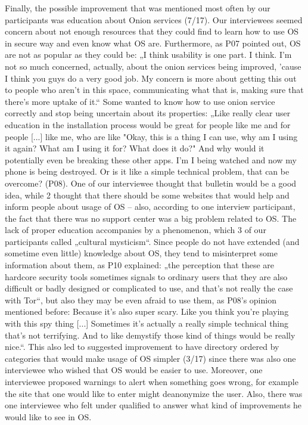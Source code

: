 Finally, the possible improvement that was mentioned most often by our participants was education about Onion services (7/17). Our interviewees seemed concern about not enough resources that they could find to learn how to use OS in secure way and even know what OS are. Furthermore, as P07 pointed out, OS are not as popular as they could be: „I think usability is one part. I think. I'm not so much concerned, actually, about the onion services being improved, 'cause I think you guys do a very good job. My concern is more about getting this out to people who aren't in this space, communicating what that is, making sure that there's more uptake of it.“
 Some wanted to know how to use onion service correctly and stop being uncertain about its properties: „Like really clear user education in the installation process would be great for people like me and for people [...] like me, who are like "Okay, this is a thing I can use, why am I using it again? What am I using it for? What does it do?" And why would it potentially even be breaking these other apps. I'm I being watched and now my phone is being destroyed. Or is it like a simple technical problem, that can be overcome? (P08). One of our interviewee thought that bulletin would be a good idea, while 2 thought that there should be some websites that would help and inform people about usage of OS – also, according to one interview participant, the fact that there was no support center was a big problem related to OS. 
The lack of proper education accompanies by a phenomenon, which 3 of our participants called „cultural mysticism“. Since people do not have extended (and sometime even little) knowledge about OS, they tend to misinterpret some information about them, as P10 explained: „the perception that these are hardcore security tools sometimes signals to ordinary users that they are also difficult or badly designed or complicated to use, and that's not really the case with Tor“, but also they may be even afraid to use them, as P08’s opinion mentioned before: Because it's also super scary. Like you think you're playing with this spy thing [...] Sometimes it's actually a really simple technical thing that's not terrifying. And to like demystify those kind of things would be really nice.“. This also led to suggested improvement to have directory ordered by categories that would make usage of OS simpler (3/17) since there was also one interviewee who wished that OS would be easier to use. Moreover, one interviewee proposed warnings to alert when something goes wrong, for example the site that one would like to enter might deanonymize the user. Also, there was one interviewee who felt under qualified to answer what kind of improvements he would like to see in OS.
